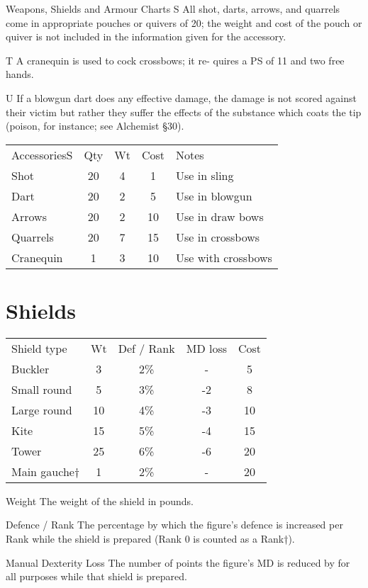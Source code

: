 \begin{Tables}{Weapons, Shields and Armour Charts}
S All shot, darts, arrows, and quarrels come in appropriate pouches or
quivers of 20; the weight and cost of the pouch or quiver is not
included in the information given for the accessory.

T A cranequin is used to cock crossbows; it re- quires a PS of 11 and
two free hands.

U If a blowgun dart does any effective damage, the damage is not
scored against their victim but rather they suffer the effects of the
substance which coats the tip (poison, for instance; see Alchemist
§30).

\begin{tabularx}{\linewidth}{Xcccl}
AccessoriesS	& Qty	& Wt	& Cost	& Notes \\
Shot		& 20	& 4	& 1	& Use in sling \\
Dart		& 20	& 2	& 5	& Use in blowgun \\
Arrows		& 20	& 2	& 10	& Use in draw bows \\
Quarrels	& 20	& 7	& 15	& Use in crossbows \\
Cranequin	& 1	& 3	& 10	& Use with crossbows \\
\end{tabularx}


\section{Shields}

\begin{tabularx}{\linewidth}{Xcccc}
Shield type	& Wt	& Def / Rank	& MD loss	& Cost \\
Buckler		& 3	& 2\%		& -		& 5 \\
Small round	& 5	& 3\%		& -2		& 8 \\
Large round	& 10	& 4\%		& -3		& 10 \\
Kite 		& 15	& 5\%		& -4		& 15 \\
Tower		& 25	& 6\%		& -6		& 20 \\
Main gauche†	& 1	& 2\%		& -		& 20 \\
\end{tabularx}

Weight The weight of the shield in pounds. 
 
Defence / Rank The percentage by which the figure’s defence is
increased per Rank while the shield is prepared (Rank 0 is counted as
a Rank†).
 
Manual Dexterity Loss The number of points the figure’s MD is reduced
by for all purposes while that shield is prepared.


\end{Tables}
